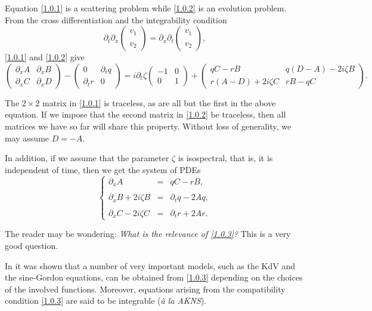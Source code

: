 \documentclass{cimart}
\newcommand{\ba}{\begin{array}}
\newcommand{\bb}{\begin{equation}}
\newcommand{\ea}{\end{array}}
\newcommand{\ee}{\end{equation}}
\begin{document}
Equation \eqref{1.0.1} is a scattering problem while \eqref{1.0.2} is an evolution problem. From the cross differentiation and the integrability condition
$$
\partial_t\partial_x\begin{pmatrix}
v_1\\
\\
v_2
\end{pmatrix}=\partial_x\partial_t\begin{pmatrix}
v_1\\
\\
v_2
\end{pmatrix},
$$
\eqref{1.0.1} and \eqref{1.0.2} give
$$
\begin{pmatrix}
\partial_x A& \partial_x B\\[2pt]  %
\partial_x C& \partial_x D
\end{pmatrix}-
\begin{pmatrix}
0& \partial_t q\\[2pt]
\partial_t r& 0
\end{pmatrix}
= i\partial_t\zeta
\begin{pmatrix}
-1& 0\\[2pt]
0& 1
\end{pmatrix}
+
\begin{pmatrix}
qC-rB& q(D-A)-2i\zeta B\\[2pt]
r(A-D)+2i\zeta C& rB-qC
\end{pmatrix}.
$$

The $2\times2$ matrix in \eqref{1.0.1} is traceless, as are all but the first in the above equation. If we impose that the second matrix in \eqref{1.0.2} be traceless, then all matrices we have so far will share this property. Without loss of generality, we may assume $D=-A$.

In addition, if we assume that the parameter $\zeta$ is isospectral, that is, it is independent of time, then we get the system of PDEs
\bb\label{1.0.3}
\left\{\ba{lcl}
\partial_x A&=&qC-rB,\\
\\
\partial_xB+2i\zeta B&=&\partial_tq-2Aq,\\
\\
\partial_xC-2i\zeta C&=&\partial_tr+2Ar.
\ea
\right.
\ee

The reader may be wondering: {\it What is the relevance of \eqref{1.0.3}?} This is a very good question.

In \cite{akns} it was shown that a number of very important models, such as the KdV and the sine-Gordon equations, can be obtained from \eqref{1.0.3} depending on the choices of the involved functions. Moreover, equations arising from the compatibility condition \eqref{1.0.3} are said to be integrable ({\it à la AKNS}).
\end{document}
